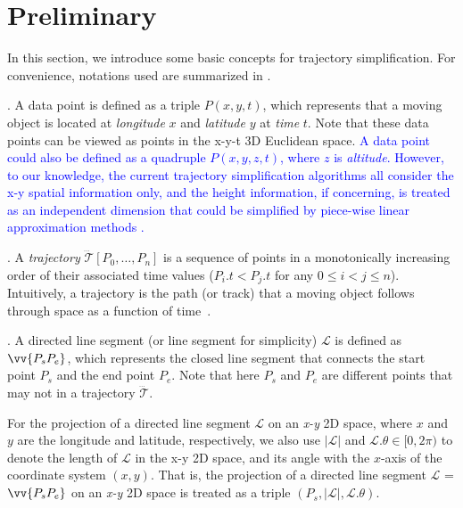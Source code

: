 \section{Preliminary}	%
\label{sec-problem}


In this section, we introduce some basic concepts for trajectory simplification.
For convenience, notations used are summarized in .

. A data point is defined as a triple $P(x, y, t)$, which represents that a moving object is located at {\em longitude} $x$ and {\em latitude} $y$ at {\em time} $t$. Note that these data points can be viewed as points in the x-y-t 3D Euclidean space.
%
\textcolor{blue}{A data point could also be defined as a quadruple $P(x, y, z, t)$, where $z$ is {\em altitude}. However, to our knowledge, the current trajectory simplification algorithms all consider the x-y spatial information only, and the height information, if concerning, is treated as an independent dimension that could be simplified by piece-wise linear approximation methods \cite{Agarwal:Metric, ORourke:Fitting, Keogh:online, Luo:Streaming, Xie:Stream,Elmeleegy:Stream}.}


. A \textit{trajectory} $\dddot{\mathcal{T}}\left[P_0, \ldots, P_n\right]$ is a sequence of points in a monotonically increasing order of their associated time values (\ie $P_i.t < P_j.t$ for any $0\le i<j\le n$). %
Intuitively, a trajectory is the path (or track) that a moving object follows through space as a function of time~\cite{physics-trajectory}.

. A directed line segment (or line segment for simplicity) $\mathcal{L}$ is defined as $\vv{P_{s}P_{e}}$, which represents the closed line segment that connects the start point $P_s$ and the end point $P_e$.
Note that here $P_s$ and $P_e$ are different points that may not in a trajectory $\dddot{\mathcal{T}}$.


For the projection of a directed line segment $\mathcal{L}$ on an \emph{x-y} 2D space, where $x$ and $y$ are the longitude and latitude, respectively, we also use $|\mathcal{L}|$ and $\mathcal{L}.\theta\in [0, 2\pi)$ to denote the length of $\mathcal{L}$ in the x-y 2D space, and its angle with the $x$-axis of the coordinate system $(x, y)$.  That is, the projection of a directed line segment $\mathcal{L}$ = $\vv{P_{s}P_{e}}$ on an \emph{x-y} 2D space is treated as a triple $(P_s, |\mathcal{L}|, \mathcal{L}.\theta)$.

